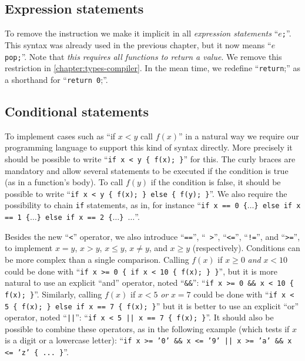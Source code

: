 \subsection{Expression statements}\label{subsection:toyc3-expr-stmt}

To remove the  instruction we make it implicit in all {\em expression
statements} ``{\tt $e$;}''. This syntax was already used in the previous
chapter, but it now means ``{\tt $e$ pop;}''. Note that {\em this requires all
functions to return a value}. We remove this restriction in
\cref{chapter:types-compiler}. In the mean time, we redefine ``{\tt return};''
as a shorthand for ``{\tt return 0};''.

\subsection{Conditional statements}

To implement cases such as ``if $x < y$ call $f(x)$'' in a natural way we
require our programming language to support this kind of syntax directly. More
precisely it should be possible to write ``{\tt if x < y \{ f(x); \}}'' for
this. The curly braces are mandatory and allow several statements to be
executed if the condition is true (as in a function's body). To call $f(y)$ if
the condition is false, it should be possible to write ``{\tt if x < y \{ f(x);
\} else \{ f(y); \}}''. We also require the possibility to chain {\tt if}
statements, as in, for instance ``{\tt if x == 0 \{$\ldots$\} else if x == 1
\{$\ldots$\} else if x == 2 \{$\ldots$\} $\ldots$}''.

Besides the new ``{\tt <}'' operator, we also introduce ``{\tt ==}'', ``{\tt
>}'', ``{\tt <=}'', ``{\tt !=}'', and ``{\tt >=}'', to implement $x=y$, $x>y$,
$x\le y$, $x\ne y$, and $x\ge y$ (respectively). Conditions can be more complex
than a single comparison. Calling $f(x)$ if $x\ge 0$ {\em and} $x<10$ could be
done with ``{\tt if x >= 0 \{ if x < 10 \{ f(x); \} \}}'', but it is more
natural to use an explicit ``and'' operator, noted ``{\tt \&\&}'': ``{\tt if x
>= 0 \&\& x < 10 \{ f(x); \}}''. Similarly, calling $f(x)$ if $x<5$ {\em or}
$x=7$ could be done with ``{\tt if x < 5 \{ f(x); \} else if x == 7 \{ f(x);
\}}'' but it is better to use an explicit ``or'' operator, noted ``{\tt ||}'':
``{\tt if x < 5 || x == 7 \{ f(x); \}}''. It should also be possible to combine
these operators, as in the following example (which tests if $x$ is a digit or
a lowercase letter): ``{\tt if x >= '0' \&\& x <= '9' || x >= 'a' \&\& x <= 'z'
\{ ... \}}''.


